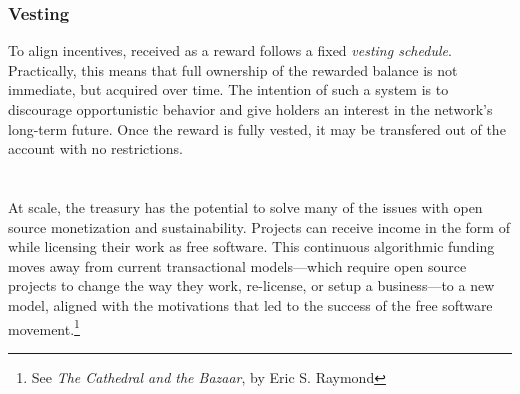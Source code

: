 \subsubsection{Vesting} To align incentives, \oscoin{} received
as a reward follows a fixed \emph{vesting schedule}. Practically, this means
that full ownership of the rewarded balance is not immediate, but acquired over time. The
intention of such a system is to discourage opportunistic behavior and give \oscoin{}
holders an interest in the network's long-term future. Once the reward is
fully vested, it may be transfered out of the account with no restrictions.
\label{s:vesting}

\section*{}

\noindent At scale, the \oscoin{} treasury has the potential to solve many of
the issues with open source monetization and sustainability. Projects can
receive income in the form of \oscoin{} while licensing their work as free
software. This continuous algorithmic funding moves
away from current transactional models---which require open source projects
to change the way they work, re-license, or setup a business---to a new model,
aligned with the motivations that led to the success of the free software
movement.\footnote{See \emph{The Cathedral and the Bazaar}, by Eric S. Raymond}
